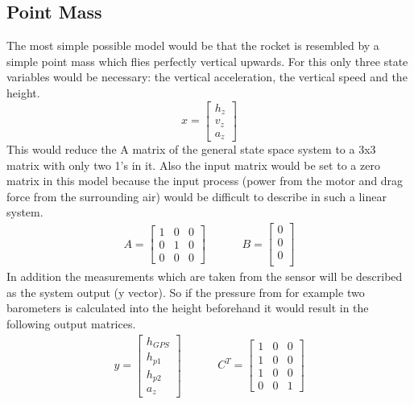   \subsection{Point Mass}
  The most simple possible model would be that the rocket is resembled by a simple point mass which flies perfectly vertical upwards.
  For this only three state variables would be necessary: the vertical acceleration, the vertical speed and the height.
  $$x = \begin{bmatrix}
  h_z\\
  v_z\\
  a_z
  \end{bmatrix} $$
  This would reduce the A matrix of the general state space system to a 3x3 matrix with only two 1's in it.
   Also the input matrix would be set to a zero matrix in this model because the input process
  (power from the motor and drag force from the surrounding air) would be difficult to describe in such a linear system.
  \begin{align*}
  A = \begin{bmatrix}
  1 & 0 & 0\\
  0 & 1 & 0\\
  0 & 0 & 0
  \end{bmatrix}
  & \hspace{1cm}
  B = \begin{bmatrix}
          0 \\
          0 \\
          0 \\
  \end{bmatrix}
  \end{align*}
  In addition the measurements which are taken from the sensor will be described as the system output (y vector).
  So if the pressure from for example two barometers is calculated into the height beforehand it would result in the following output matrices.
 \begin{align*}
 y = \begin{bmatrix}
	  h_{GPS}	\\
          h_{p1}	\\
          h_{p2}	\\
          a_z
     \end{bmatrix}
    & \hspace{1cm}
 C^T = \begin{bmatrix}
         1 & 0 & 0	\\
	 1 & 0 & 0	\\
         1 & 0 & 0	\\
         0 & 0 & 1
        \end{bmatrix}
  \end{align*}


